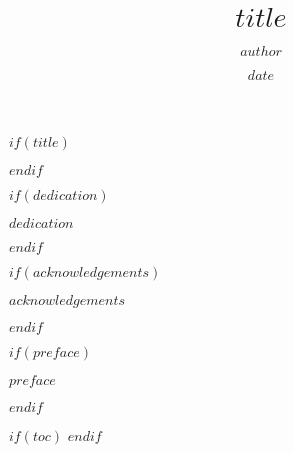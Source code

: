 \documentclass[12pt,twoside]{reedthesis}
\title{$title$}
\author{$author$}
\date{$date$}
\begin{document}
$if(title)$
  \maketitle%
    \newpage
    \vspace*{\fill}
    \begin{center}
        \textcopyright{} \@date{} \@author
    \end{center}
    \vspace*{\fill}
    \newpage

    \setcounter{secnumdepth}{-1}%
$endif$

\frontmatter %
\pagestyle{empty} %

$if(dedication)$
  \begin{dedication}
    \vspace*{\fill}%
            \begin{center}%
            \realSingleSpace
              $dedication$
            \end{center}
            \vspace*{\fill}
  \end{dedication}
$endif$


$if(acknowledgements)$
  \begin{acknowledgements}
    $acknowledgements$
  \end{acknowledgements}
$endif$

$if(preface)$
  \begin{preface}
    $preface$
  \end{preface}
$endif$

$if(toc)$
  \setcounter{secnumdepth}{$toc-depth$}
  \setcounter{tocdepth}{$toc-depth$}
  {\realSingleSpace\tableofcontents}%
$endif$

\ifhaveTables
        {\realSingleSpace\listoftables}%
    \fi
    
    \ifhaveFigures
        {\realSingleSpace\listoffigures}%
    \fi
    
\end{document}
